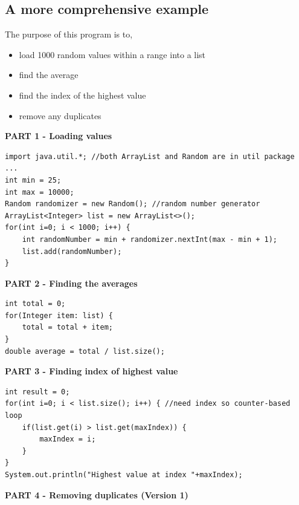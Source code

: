 \subsection{A more comprehensive example}

The purpose of this program is to,

\begin{itemize}
\item load 1000 random values within a range into a list
\item find the average
\item find the index of the highest value
\item remove any duplicates
\end{itemize}

\begin{center}
\textbf{PART 1 - Loading values}	
\end{center}

\begin{lstlisting}
import java.util.*; //both ArrayList and Random are in util package
...
int min = 25;
int max = 10000;
Random randomizer = new Random(); //random number generator
ArrayList<Integer> list = new ArrayList<>();
for(int i=0; i < 1000; i++) {
	int randomNumber = min + randomizer.nextInt(max - min + 1);
	list.add(randomNumber);
}
\end{lstlisting}

\begin{center}
\textbf{PART 2 - Finding the averages}	
\end{center}

\begin{lstlisting}
int total = 0;
for(Integer item: list) {
	total = total + item;
}
double average = total / list.size();
\end{lstlisting}

\begin{center}
\textbf{PART 3 - Finding index of highest value}	
\end{center}

\begin{lstlisting}
int result = 0;
for(int i=0; i < list.size(); i++) { //need index so counter-based loop
	if(list.get(i) > list.get(maxIndex)) {
		maxIndex = i; 
	}
}
System.out.println("Highest value at index "+maxIndex);
\end{lstlisting}

\begin{center}
\textbf{PART 4 - Removing duplicates (Version 1)}	
\end{center}

